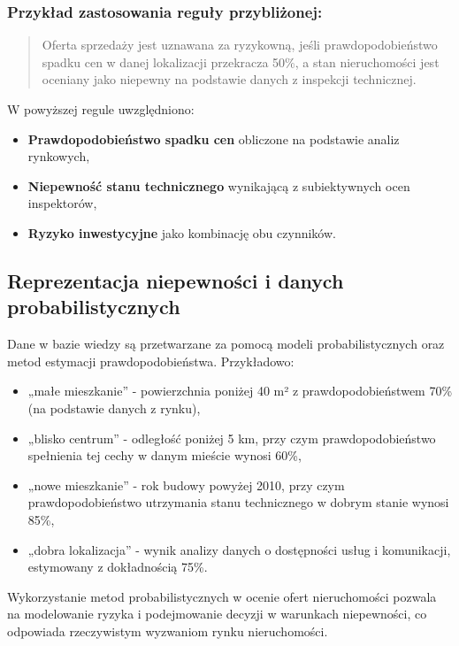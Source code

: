 \subsubsection*{Przykład zastosowania reguły przybliżonej:}
\begin{quote}
Oferta sprzedaży jest uznawana za ryzykowną, jeśli prawdopodobieństwo spadku cen w danej lokalizacji przekracza 50\%, a stan nieruchomości jest oceniany jako niepewny na podstawie danych z inspekcji technicznej.
\end{quote}

W powyższej regule uwzględniono:
\begin{itemize}
    \item \textbf{Prawdopodobieństwo spadku cen} obliczone na podstawie analiz rynkowych,
    \item \textbf{Niepewność stanu technicznego} wynikającą z subiektywnych ocen inspektorów,
    \item \textbf{Ryzyko inwestycyjne} jako kombinację obu czynników.
\end{itemize}

\subsection*{Reprezentacja niepewności i danych probabilistycznych}

Dane w bazie wiedzy są przetwarzane za pomocą modeli probabilistycznych oraz metod estymacji prawdopodobieństwa. Przykładowo:
\begin{itemize}
    \item „małe mieszkanie” - powierzchnia poniżej 40 m² z prawdopodobieństwem 70\% (na podstawie danych z rynku),
    \item „blisko centrum” - odległość poniżej 5 km, przy czym prawdopodobieństwo spełnienia tej cechy w danym mieście wynosi 60\%,
    \item „nowe mieszkanie” - rok budowy powyżej 2010, przy czym prawdopodobieństwo utrzymania stanu technicznego w dobrym stanie wynosi 85\%,
    \item „dobra lokalizacja” - wynik analizy danych o dostępności usług i komunikacji, estymowany z dokładnością 75\%.
\end{itemize}

Wykorzystanie metod probabilistycznych w ocenie ofert nieruchomości pozwala na modelowanie ryzyka i podejmowanie decyzji w warunkach niepewności, co odpowiada rzeczywistym wyzwaniom rynku nieruchomości.


